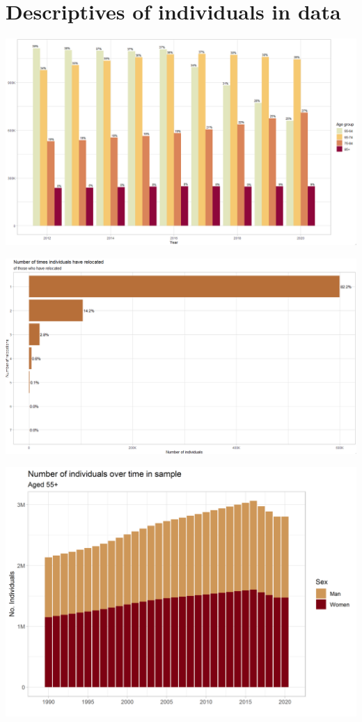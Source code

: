 \documentclass[
]{book}
\begin{document}
\hypertarget{descriptives-of-individuals-in-data}{%
\chapter{Descriptives of individuals in data}\label{descriptives-of-individuals-in-data}}

\includegraphics[width=1\linewidth]{output/figures/age_groups_2012_2020_brown_percent}

\includegraphics[width=1\linewidth]{output/figures/no_individual_red}

\includegraphics[width=1\linewidth]{output/figures/n_sex_time}
\end{document}
